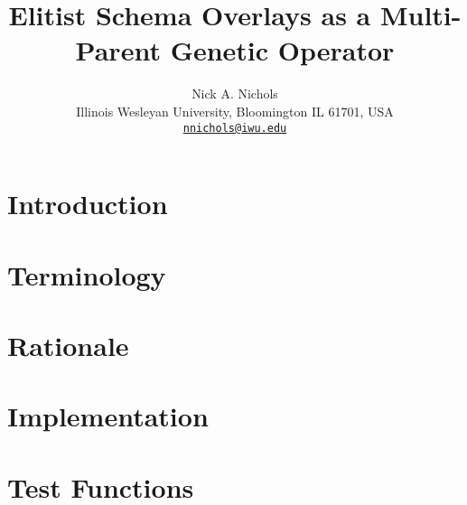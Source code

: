 \documentclass{article}
\makeatletter
\def \papertitle {Elitist Schema Overlays as a Multi-Parent Genetic Operator}
\def \paperauthors {Nick A. Nichols}
\def \paperinstitute {\small Illinois Wesleyan University, Bloomington IL 61701, USA}
\def \paperemails {\small\href{mailto:nnichols@iwu.edu}{\nolinkurl{nnichols@iwu.edu}}}
\makeatother
\begin{document}
\title{\papertitle}
\author{\paperauthors \\ \paperinstitute \\ \paperemails}

\maketitle


\begin{abstract}

\end{abstract}








\section{Introduction} 
\label{sec:introduction}



\section{Terminology} 
\label{sec:terminology}



\section{Rationale}
\label{sec:rationale}



\section{Implementation}
\label{sec:implementation}



\section{Test Functions}
\label{sec:testfunctions}

\end{document}

